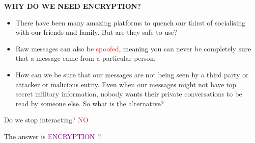 \documentclass{beamer}
\begin{document}
\begin{frame}
\begin{tcolorbox}
\begin{center}
\textsc{\textbf{\textcolor{byzantium}{WHY DO WE NEED ENCRYPTION?}}}
\end{center}
\end{tcolorbox}
\begin{flushleft}
\begin{itemize}
\item There have been many amazing platforms to quench our thirst of socialising with our friends and family. But are they safe to use?
\item Raw messages can also be \textcolor{red} {spoofed}, meaning you can never be completely sure that a message came from a particular person.
\item How  can we be sure that our messages are not being seen by a third party or attacker or malicious entity. Even when our messages might not have top secret military information, nobody wants their private conversations to be read by someone else. So what is the alternative?
\end{itemize}
\end{flushleft}
\begin{center}
\begin{tcolorbox}
\begin{center}
Do we stop interacting?  \textcolor{red} {NO}
\end{center}
\begin{center}
The answer is \textcolor{purple} {ENCRYPTION} !!
\end{center}
\end{tcolorbox}
\end{center}
\end{frame}
\end{document}
